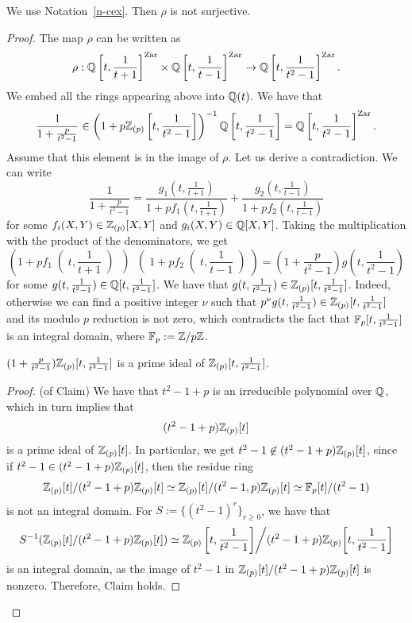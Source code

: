\begin{prop}\label{p-non-surje}
We use Notation~\ref{n-cex}. 
Then $\rho$ is not surjective.
\end{prop}


\begin{proof}
The map $\rho$ can be written as 
$$\rho:\mathbb{Q}\left[t, \frac{1}{t+1}\right]^{{\operatorname{Zar}}} \times \mathbb{Q}\left[t, \frac{1}{t-1}\right]^{{\operatorname{Zar}}} 
\to \mathbb{Q}\left[t, \frac{1}{t^2-1}\right]^{{\operatorname{Zar}}}.$$
We embed all the rings appearing above into $\mathbb{Q}(t)$. 
We have that 
$$\frac{1}{1+\frac{p}{t^2-1}} \in 
\left(1+p\mathbb{Z}_{(p)}\left[t, \frac{1}{t^2-1}\right]\right)^{-1}
\mathbb{Q}\left[t, \frac{1}{t^2-1}\right]=\mathbb{Q}\left[t, \frac{1}{t^2-1}\right]^{{\operatorname{Zar}}}.$$
Assume that this element is in the image of $\rho$. 
Let us derive a contradiction. 
We can write 
$$ \frac{1}{1+\frac{p}{t^2-1}}=\frac{g_1(t, \frac{1}{t+1})}{1+pf_1(t, \frac{1}{t+1})}+
\frac{g_2(t, \frac{1}{t-1})}{1+pf_2(t, \frac{1}{t-1})}$$
for some $f_i(X, Y) \in \mathbb{Z}_{(p)}[X, Y]$ and $g_i(X, Y) \in \mathbb{Q}[X, Y]$. 
Taking the multiplication with the product of the denominators, 
we get 
{\small 
\begin{equation}\label{e-cex1}
\left(1+pf_1\middle(t, \frac{1}{t+1}\middle)\middle)\middle(1+pf_2\middle(t, \frac{1}{t-1}\middle)\right)=\left(1+\frac{p}{t^2-1}\right)g\left(t, \frac{1}{t^2-1}\right)
\end{equation}
}
for some $g(t, \frac{1}{t^2-1}) \in \mathbb{Q}[t, \frac{1}{t^2-1}]$. 
We have that $g(t, \frac{1}{t^2-1}) \in \mathbb{Z}_{(p)}[t, \frac{1}{t^2-1}]$. 
Indeed, otherwise we can find a positive integer $\nu$ such that 
$p^{\nu}g(t, \frac{1}{t^2-1}) \in \mathbb{Z}_{(p)}[t, \frac{1}{t^2-1}]$ and its modulo $p$ reduction 
is not zero, which contradicts the fact that $\mathbb{F}_p[t, \frac{1}{t^2-1}]$ 
is an integral domain, where $\mathbb{F}_p:=\mathbb{Z}/p\mathbb{Z}$. 




\begin{claim}
$(1+\frac{p}{t^2-1})\mathbb{Z}_{(p)}[t, \frac{1}{t^2-1}]$ is a prime ideal of $\mathbb{Z}_{(p)}[t, \frac{1}{t^2-1}]$. 
\end{claim}

\begin{proof}(of Claim) 
We have that $t^2-1+p$ 
is an irreducible polynomial over $\mathbb{Q}$, which in turn implies that 
$$(t^2-1+p)\mathbb{Z}_{(p)}[t]$$
is a prime ideal of $\mathbb{Z}_{(p)}[t]$. 
In particular, we get $t^2-1 \not\in (t^2-1+p)\mathbb{Z}_{(p)}[t]$, 
since if $t^2-1 \in (t^2-1+p)\mathbb{Z}_{(p)}[t]$, then the residue ring 
$$\mathbb{Z}_{(p)}[t]/(t^2-1+p)\mathbb{Z}_{(p)}[t] \simeq \mathbb{Z}_{(p)}[t]/(t^2-1, p)\mathbb{Z}_{(p)}[t] \simeq \mathbb{F}_p[t]/(t^2-1)$$
is not an integral domain. 
For $S:=\{(t^2-1)^r\}_{r \geq 0}$, we have that 
{\small 
$$S^{-1}(\mathbb{Z}_{(p)}[t]/(t^2-1+p)\mathbb{Z}_{(p)}[t]) \simeq 
\mathbb{Z}_{(p)}\left[t, \frac{1}{t^2-1}\middle]\middle/(t^2-1+p)\mathbb{Z}_{(p)}\middle[t, \frac{1}{t^2-1}\right]$$
}
is an integral domain, as the image of $t^2-1$ in $\mathbb{Z}_{(p)}[t]/(t^2-1+p)\mathbb{Z}_{(p)}[t]$ is nonzero. 
Therefore, Claim holds. 
\end{proof}


\end{proof}
